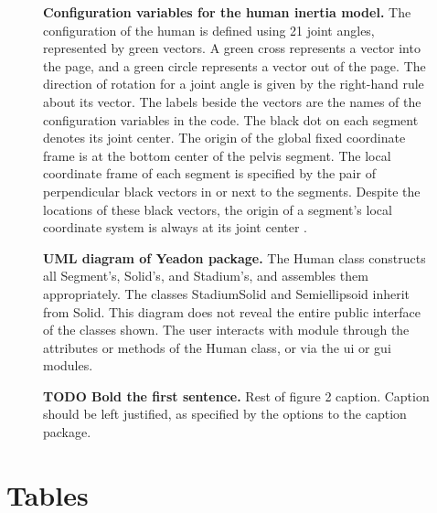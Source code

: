 \documentclass[10pt]{article}
\begin{document}
\begin{figure}[!ht]
\begin{center}
\end{center}
\caption{
{\bf Configuration variables for the human inertia model.}  The configuration
of the human is defined using 21 joint angles, represented by green vectors. A
green cross represents a vector into the page, and a
green circle represents a vector out of the page. The direction of rotation for
a joint angle is given by the right-hand rule about its vector. The labels
beside the vectors are the names of the configuration variables in the code.
The black dot on each segment denotes its joint center. The origin of the
global fixed coordinate frame is at the bottom center of the
pelvis segment. The local coordinate frame of each segment is specified by the
pair of perpendicular black vectors in or next to the segments. Despite the
locations of these black vectors, the origin of a segment's local coordinate
system is always at its joint center \cite{Yeadon1990e}.
}
\label{fig:config}
\end{figure}

\begin{figure}[!ht]
\begin{center}
\end{center}
\caption{
{\bf UML diagram of Yeadon package.}  The Human class constructs all
Segment's, Solid's, and Stadium's, and assembles them
appropriately. The classes StadiumSolid and Semiellipsoid inherit
from Solid. This diagram does not reveal the entire public interface of
the classes shown. The user interacts with module through the attributes or
methods of the Human class, or via the ui or gui modules.
}
\label{fig:umldiagram}
\end{figure}

\begin{figure}[!ht]
\begin{center}
\end{center}
\caption{
{\bf TODO Bold the first sentence.}  Rest of figure 2  caption.  Caption 
should be left justified, as specified by the options to the caption 
package.
}
\label{fig:femaledefault}
\end{figure}

\section*{Tables}
\end{document}
